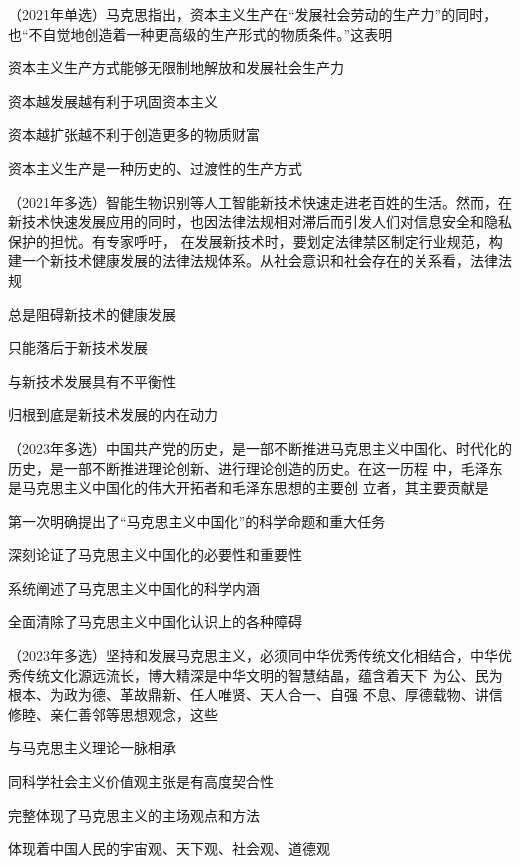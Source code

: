\documentclass[lang=cn,blue,10pt,scheme=chinese,twocol]{zznote}
\begin{document}
\begin{example} （2021年单选）马克思指出，资本主义生产在“发展社会劳动的生产力”的同时，也“不自觉地创造着一种更高级的生产形式的物质条件。”这表明
	\begin{choice}
		\item 资本主义生产方式能够无限制地解放和发展社会生产力
		\item 资本越发展越有利于巩固资本主义
		\item 资本越扩张越不利于创造更多的物质财富
		\item 资本主义生产是一种历史的、过渡性的生产方式
	\end{choice}
\end{example}




\begin{example}
	（2021年多选）智能生物识别等人工智能新技术快速走进老百姓的生活。然而，在新技术快速发展应用的同时，也因法律法规相对滞后而引发人们对信息安全和隐私保护的担忧。有专家呼吁， 在发展新技术时，要划定法律禁区制定行业规范，构建一个新技术健康发展的法律法规体系。从社会意识和社会存在的关系看，法律法规
	\begin{choice}
		\item 总是阻碍新技术的健康发展
		\item 只能落后于新技术发展
		\item 与新技术发展具有不平衡性
		\item 归根到底是新技术发展的内在动力
	\end{choice}
\end{example}

\begin{example}	（2023年多选）中国共产党的历史，是一部不断推进马克思主义中国化、时代化的 历史，是一部不断推进理论创新、进行理论创造的历史。在这一历程  中，毛泽东是马克思主义中国化的伟大开拓者和毛泽东思想的主要创
	立者，其主要贡献是
	\begin{choice}
		\item 第一次明确提出了“马克思主义中国化”的科学命题和重大任务
		\item 深刻论证了马克思主义中国化的必要性和重要性
		\item 系统阐述了马克思主义中国化的科学内涵
		\item 全面清除了马克思主义中国化认识上的各种障碍
	\end{choice}
\end{example}

\begin{example} （2023年多选）坚持和发展马克思主义，必须同中华优秀传统文化相结合，中华优 秀传统文化源远流长，博大精深是中华文明的智慧结晶，蕴含着天下  为公、民为根本、为政为德、革故鼎新、任人唯贤、天人合一、自强
	不息、厚德载物、讲信修睦、亲仁善邻等思想观念，这些
	\begin{choice}
		\item  与马克思主义理论一脉相承
		\item 同科学社会主义价值观主张是有高度契合性
		\item 完整体现了马克思主义的主场观点和方法
		\item 体现着中国人民的宇宙观、天下观、社会观、道德观
	\end{choice}
\end{example}
\end{document}
